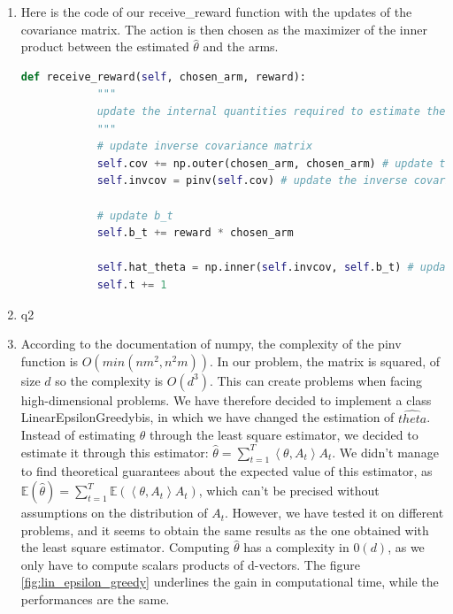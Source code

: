 \begin{enumerate}
    \item Here is the code of our receive\_reward function with the updates of the covariance matrix. The action is then chosen as the maximizer of the inner product between the estimated $\hat{\theta}$ and the arms.

    \begin{lstlisting}[language=Python]
        def receive_reward(self, chosen_arm, reward):
            """
            update the internal quantities required to estimate the parameter theta using least squares
            """
            # update inverse covariance matrix
            self.cov += np.outer(chosen_arm, chosen_arm) # update the covariance matrix
            self.invcov = pinv(self.cov) # update the inverse covariance matrix
        
            # update b_t
            self.b_t += reward * chosen_arm
        
            self.hat_theta = np.inner(self.invcov, self.b_t) # update the least square estimate
            self.t += 1
        \end{lstlisting}

        
    \item q2
    \item According to the documentation of numpy, the complexity of the pinv function is $O(min(n m^2, n^2m))$. In our problem, the matrix is squared, of size $d$ so the complexity is $O(d^3)$.
This can create problems when facing high-dimensional problems. We have therefore decided to implement a class LinearEpsilonGreedybis, in which we have changed the estimation of $\hat{theta}$. 
Instead of estimating $\theta$ through the least square estimator, we decided to estimate it through this estimator: $\hat{\theta} = \sum_{t=1}^{T} \left\langle \theta , A_t\right\rangle A_t$. 
We didn't manage to find theoretical guarantees about the expected value of this estimator, as $\mathbb{E}(\hat{\theta}) = \sum_{t=1}^{T} \mathbb{E} ( \left\langle \theta , A_t\right\rangle A_t) $, which can't be precised without assumptions on the distribution of $A_t$.
However, we have tested it on different problems, and it seems to obtain the same results as the one obtained with the least square estimator.
Computing $\hat{\theta}$ has a complexity in $0(d)$, as we only have to compute scalars products of d-vectors. The figure \ref{fig:lin_epsilon_greedy} underlines the gain in computational time, while the performances are the same.


\end{enumerate}

